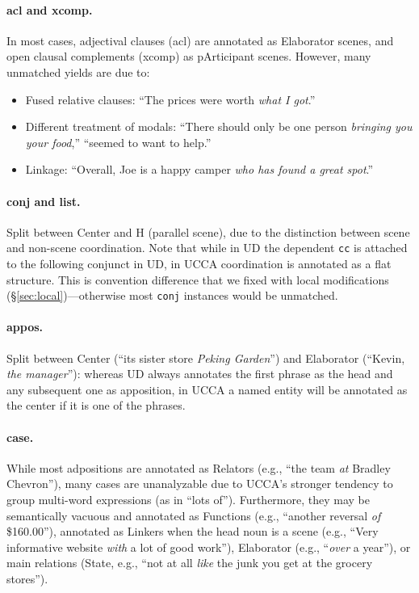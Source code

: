 \documentclass[11pt,a4paper]{article}
\begin{document}
\paragraph{acl and xcomp.}

In most cases, adjectival clauses (acl) are annotated as Elaborator scenes,
and open clausal complements (xcomp) as pArticipant scenes.
However, many unmatched yields are due to:
\begin{itemize}
\item Fused relative clauses: ``The prices were worth \textit{what I got}.''
\item Different treatment of modals: ``There should only be one person \textit{bringing you your food},''
``seemed to want to help.''
\item Linkage: ``Overall, Joe is a happy camper \textit{who has found a great spot}.''
\end{itemize}

\paragraph{conj and list.}
Split between Center and H (parallel scene), due to the
distinction between scene and non-scene coordination.
Note that while in UD the dependent \verb|cc| is attached to the following conjunct in UD,
in UCCA coordination is annotated as a flat structure.
This is convention difference that we fixed with local modifications
(\S\ref{sec:local})---otherwise most \verb|conj| instances would be unmatched.

\paragraph{appos.}
Split between Center (``its sister store \textit{Peking Garden}'')
and Elaborator (``Kevin, \textit{the manager}''):
whereas UD always annotates the first phrase as the head and any subsequent one as apposition,
in UCCA a named entity will be annotated as the center if it is one of the phrases.

\paragraph{case.}
While most adpositions are annotated as Relators (e.g., ``the team \textit{at} Bradley Chevron''),
many cases are unanalyzable due to UCCA's stronger tendency to group multi-word expressions
(as in ``lots of'').
Furthermore, they may be semantically vacuous and annotated as Functions
(e.g., ``another reversal \textit{of} \$160.00''),
annotated as Linkers when the head noun is a scene
(e.g., ``Very informative website \textit{with} a lot of good work''),
Elaborator (e.g., ``\textit{over} a year''),
or main relations (State, e.g., ``not at all \textit{like} the junk you get at the grocery stores'').
\end{document}
